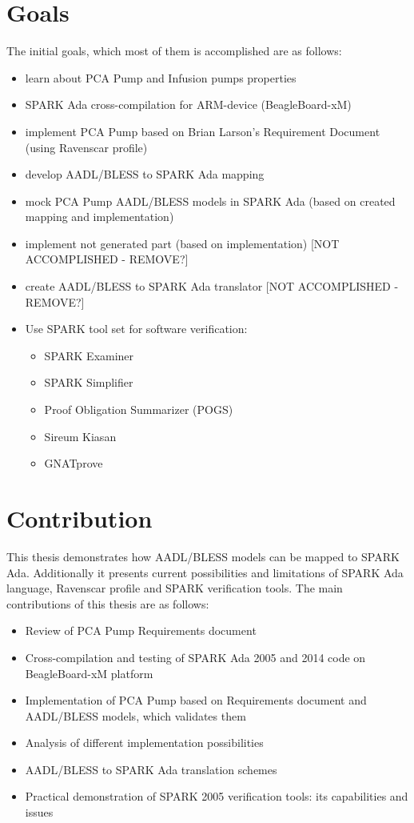 \section{Goals}
\label{introduction:goals}
The initial goals, which most of them is accomplished are as follows:
\begin{itemize}
	\item learn about PCA Pump and Infusion pumps properties
	\item SPARK Ada cross-compilation for ARM-device (BeagleBoard-xM)
	\item implement PCA Pump based on Brian Larson's Requirement Document \cite{OpenSourcePCAPump:Paper} (using Ravenscar profile)
	\item develop AADL/BLESS to SPARK Ada mapping
	\item mock PCA Pump AADL/BLESS models in SPARK Ada (based on created mapping and implementation)
	\item implement not generated part (based on implementation) [NOT ACCOMPLISHED - REMOVE?]
	\item create AADL/BLESS to SPARK Ada translator [NOT ACCOMPLISHED - REMOVE?]
	\item Use SPARK tool set for software verification:
		\begin{itemize}
			\item SPARK Examiner
			\item SPARK Simplifier
			\item Proof Obligation Summarizer (POGS)
			\item Sireum Kiasan
			\item GNATprove
		\end{itemize}
\end{itemize}




\section{Contribution}
\label{introduction:contribution}
This thesis demonstrates how AADL/BLESS models can be mapped to SPARK Ada. Additionally it presents current possibilities and limitations of SPARK Ada language, Ravenscar profile and SPARK verification tools. The main contributions of this thesis are as follows:
\begin{itemize}
	\item Review of PCA Pump Requirements document \cite{OpenSourcePCAPump:Paper}
	\item Cross-compilation and testing of SPARK Ada 2005 and 2014 code on BeagleBoard-xM platform
	\item Implementation of PCA Pump based on Requirements document \cite{OpenSourcePCAPump:Paper} and AADL/BLESS models, which validates them
	\item Analysis of different implementation possibilities
	\item AADL/BLESS to SPARK Ada translation schemes
	\item Practical demonstration of SPARK 2005 verification tools: its capabilities and issues
\end{itemize}


